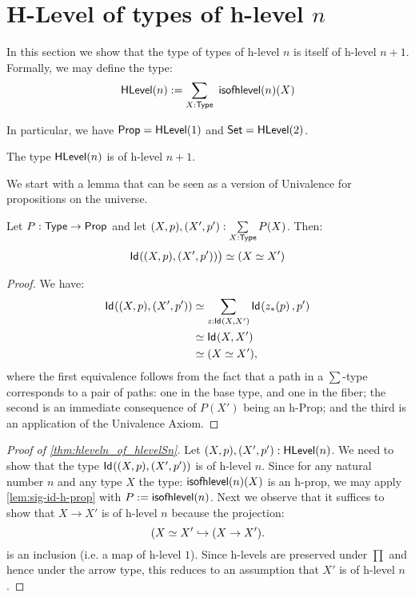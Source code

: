 \section{H-Level of types of h-level $n$}

In this section we show that the type of types of h-level $n$ is itself of h-level $n+1$. Formally, we may define the type:
 \[\HLevel(n) := \sum_{X : \type} \ \isofhlevel(n)(X) \]

In particular, we have $\mathsf{Prop} = \mathsf{HLevel}(1)$ and $\mathsf{Set} = \mathsf{HLevel}(2)$.

\begin{thm}\label{thm:hleveln_of_hlevelSn}
 The type $\mathsf{HLevel}(n)$ is of h-level $n+1$.
\end{thm}

We start with a lemma that can be seen as a version of Univalence for propositions on the universe.

\begin{lem}\label{lem:sig-id-h-prop}
 Let $P : \mathsf{Type} \to \mathsf{Prop}$ and let $(X, p), (X', p') : \sum\limits_{X : \mathsf{Type}} P(X)$. Then:
 \[ \mathsf{Id}_{}((X, p),(X', p')) \big) \simeq (X \simeq X')\]
\end{lem}

\begin{proof}
 We have:
 \begin{equation*}\begin{split}
 \mathsf{Id}_{}((X, p),(X', p')) & \simeq \sum_{z : \mathsf{Id}_{}(X,X')} \mathsf{Id}_{}({z}_{*}\!\left({p}\right),p') \\
  & \simeq \mathsf{Id}_{}(X,X') \\
  & \simeq (X \simeq X'),
 \end{split}
 \end{equation*}
 where the first equivalence follows from the fact that a path in a $\sum$-type corresponds to a pair of paths: one in the base type, and one in the fiber; the second is an immediate consequence of $P(X')$ being an h-Prop; and the third is an application of the Univalence Axiom.
\end{proof}

\begin{proof}[Proof of \autoref{thm:hleveln_of_hlevelSn}]
 Let $(X, p), (X', p') : \mathsf{HLevel}(n)$. We need to show that the type $\mathsf{Id}_{}((X, p),(X', p'))$ is of h-level $n$. Since for any natural number $n$ and any type $X$ the type: $\mathsf{isofhlevel}(n)(X)$ is an h-prop, we may apply \autoref{lem:sig-id-h-prop} with $P := \mathsf{isofhlevel}(n)$. Next we observe that it suffices to show that $X \rightarrow X'$ is of h-level $n$ because the projection:
 \[(X \simeq X' \hookrightarrow (X \rightarrow X').\]
 is an inclusion (i.e. a map of h-level $1$). Since h-levels are preserved under $\prod$ and hence under the arrow type, this reduces to an assumption that $X'$ is of h-level $n$.
\end{proof}